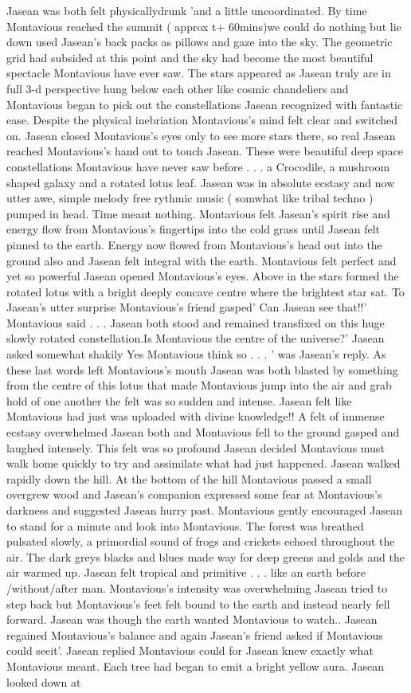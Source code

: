 \documentclass[12pt]{book}
\begin{document}
Jasean was both felt physicallydrunk 'and a little uncoordinated. By time Montavious reached the summit ( approx t+ 60mins)we could do nothing but lie down used Jasean's back packs as pillows and gaze into the sky. The geometric grid had subsided at this point and the sky had become the most beautiful spectacle Montavious have ever saw. The stars appeared as Jasean truly are in full 3-d perspective hung below each other like cosmic chandeliers and Montavious began to pick out the constellations Jasean recognized with fantastic ease. Despite the physical inebriation Montavious's mind felt clear and switched on. Jasean closed Montavious's eyes only to see more stars there, so real Jasean reached Montavious's hand out to touch Jasean. These were beautiful deep space constellations Montavious have never saw before . . .  a Crocodile, a mushroom shaped galaxy and a rotated lotus leaf. Jasean was in absolute ecstasy and now utter awe, simple melody free rythmic music ( somwhat like tribal techno ) pumped in head. Time meant nothing. Montavious felt Jasean's spirit rise and energy flow from Montavious's fingertips into the cold grass until Jasean felt pinned to the earth. Energy now flowed from Montavious's head out into the ground also and Jasean felt integral with the earth. Montavious felt perfect and yet so powerful Jasean opened Montavious's eyes. Above in the stars formed the rotated lotus with a bright deeply concave centre where the brightest star sat. To Jasean's utter surprise Montavious's friend gasped' Can Jasean see that!!' Montavious said . . .  Jasean both stood and remained transfixed on this huge slowly rotated constellation.Is Montavious the centre of the universe?' Jasean asked somewhat shakily Yes Montavious think so . . .  ' was Jasean's reply. As these last words left Montavious's mouth Jasean was both blasted by something from the centre of this lotus that made Montavious jump into the air and grab hold of one another the felt was so sudden and intense. Jasean felt like Montavious had just was uploaded with divine knowledge!! A felt of immense ecstasy overwhelmed Jasean both and Montavious fell to the ground gasped and laughed intensely. This felt was so profound Jasean decided Montavious must walk home quickly to try and assimilate what had just happened. Jasean walked rapidly down the hill. At the bottom of the hill Montavious passed a small overgrew wood and Jasean's companion expressed some fear at Montavious's darkness and suggested Jasean hurry past. Montavious gently encouraged Jasean to stand for a minute and look into Montavious. The forest was breathed pulsated slowly, a primordial sound of frogs and crickets echoed throughout the air. The dark greys blacks and blues made way for deep greens and golds and the air warmed up. Jasean felt tropical and primitive . . .  like an earth before /without/after man. Montavious's intensity was overwhelming Jasean tried to step back but Montavious's feet felt bound to the earth and instead nearly fell forward. Jasean was though the earth wanted Montavious to watch.. Jasean regained Montavious's balance and again Jasean's friend asked if Montavious could seeit'. Jasean replied Montavious could for Jasean knew exactly what Montavious meant. Each tree had began to emit a bright yellow aura. Jasean looked down at 
\end{document}
